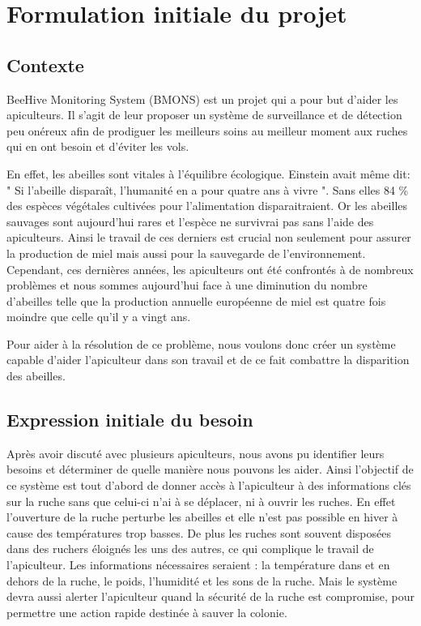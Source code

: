 \chapter{Formulation initiale du projet}



\section{Contexte}

BeeHive Monitoring System (BMONS) est un projet qui a pour but d'aider les apiculteurs. Il s'agit de leur proposer un système de surveillance et de détection peu onéreux afin de prodiguer les meilleurs soins au meilleur moment aux ruches qui en ont besoin et d'éviter les vols.

En effet, les abeilles sont vitales à l'équilibre écologique. Einstein avait même dit: " Si l’abeille disparaît, l’humanité en a pour quatre ans à vivre ". Sans elles 84 \% des espèces végétales cultivées pour l'alimentation disparaitraient. Or les abeilles sauvages sont aujourd'hui rares et l'espèce ne survivrai pas sans l'aide des apiculteurs. Ainsi le travail de ces derniers est crucial non seulement pour assurer la production de miel mais aussi pour la sauvegarde de l'environnement. Cependant, ces dernières années, les apiculteurs ont été confrontés à de nombreux problèmes et nous sommes aujourd'hui face à une diminution du nombre d'abeilles telle que la production annuelle européenne de miel est quatre fois moindre que celle qu'il y a vingt ans. 

Pour aider à la résolution de ce problème, nous voulons donc créer un système capable d'aider l'apiculteur dans son travail et de ce fait combattre la disparition des abeilles. 

\section{Expression initiale du besoin}

Après avoir discuté avec plusieurs apiculteurs, nous avons pu identifier leurs besoins et déterminer de quelle manière nous pouvons les aider. Ainsi l'objectif de ce système est tout d'abord de donner accès à l'apiculteur à des informations clés sur la ruche sans que celui-ci n'ai à se déplacer, ni à ouvrir les ruches. En effet l'ouverture de la ruche perturbe les abeilles et elle n'est pas possible en hiver à cause des températures trop basses. De plus les ruches sont souvent disposées dans des ruchers éloignés les uns des autres, ce qui complique le travail de l'apiculteur. Les informations nécessaires seraient : la température dans et en dehors de la ruche, le poids, l'humidité et les sons de la ruche. Mais le système devra aussi alerter l'apiculteur quand la sécurité de la ruche est compromise, pour permettre une action rapide destinée à sauver la colonie.

